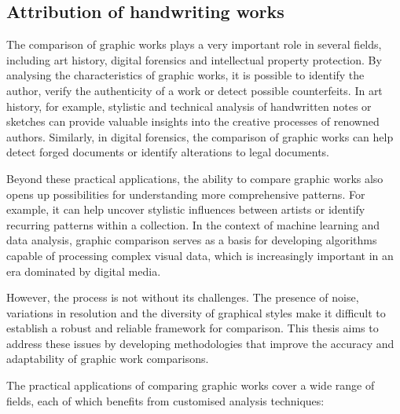 \begin{toReview}
	\section{Attribution of handwriting works}
		\noindent The comparison of graphic works plays a very important role in several fields, including art history, digital forensics and intellectual property protection. By analysing the characteristics of graphic works, it is possible to identify the author, verify the authenticity of a work or detect possible counterfeits. In art history, for example, stylistic and technical analysis of handwritten notes or sketches can provide valuable insights into the creative processes of renowned authors. Similarly, in digital forensics, the comparison of graphic works can help detect forged documents or identify alterations to legal documents.

		\noindent Beyond these practical applications, the ability to compare graphic works also opens up possibilities for understanding more comprehensive patterns. For example, it can help uncover stylistic influences between artists or identify recurring patterns within a collection. In the context of machine learning and data analysis, graphic comparison serves as a basis for developing algorithms capable of processing complex visual data, which is increasingly important in an era dominated by digital media.

		\noindent However, the process is not without its challenges. The presence of noise, variations in resolution and the diversity of graphical styles make it difficult to establish a robust and reliable framework for comparison. This thesis aims to address these issues by developing methodologies that improve the accuracy and adaptability of graphic work comparisons.

		\bigskip
		\noindent The practical applications of comparing graphic works cover a wide range of fields, each of which benefits from customised analysis techniques:


\end{toReview}
